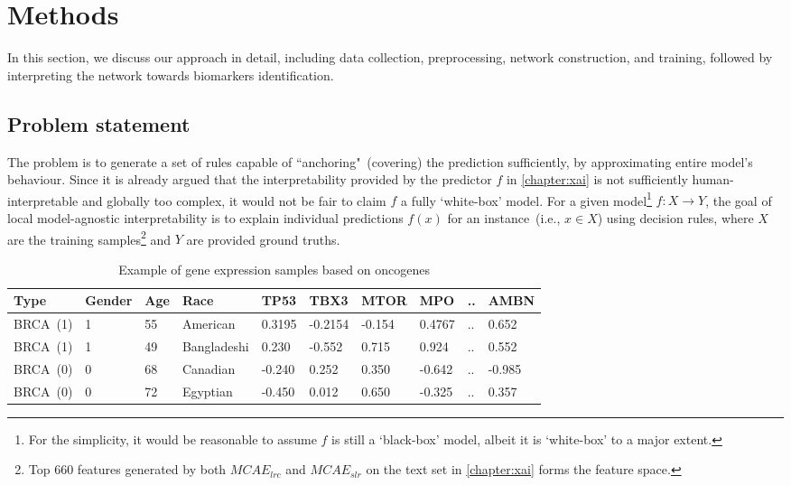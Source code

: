 \section{Methods} \label{chapter_7:mm}
In this section, we discuss our approach in detail, including data collection, preprocessing, network construction, and training, followed by interpreting the network towards biomarkers identification. 

\subsection{Problem statement}
The problem is to generate a set of rules capable of ``anchoring"~(covering) the prediction sufficiently, by approximating entire model's behaviour. Since it is already argued that the interpretability provided by the predictor ${f}$ in \cref{chapter:xai} is not sufficiently human-interpretable and globally too complex, it would not be fair to claim ${f}$ a fully `white-box' model. For a given model\footnote{For the simplicity, it would be reasonable to assume ${f}$ is  still a `black-box' model, albeit it is `white-box' to a major extent.} ${f}: X \rightarrow Y$, the goal of local model-agnostic interpretability is to explain individual predictions ${f}(x)$ for an instance~(i.e., $x \in X$) using decision rules, where $X$ are the training samples\footnote{Top 660 features generated by both $MCAE_{lrc}$ and $MCAE_{slr}$ on the text set in \cref{chapter:xai} forms the feature space.} and $Y$ are provided ground truths. %

\begin{table}[h!]
    \caption{Example of gene expression samples based on oncogenes}
    \label{ge:ancor_example}
    \vspace{-6mm}
    \begin{center}
        \scriptsize
        \begin{tabular}{l|l|l|l|l|l|l|l|l|l}
            \hline
            \rowcolor{Gray}
            \textbf{Type} & \textbf{Gender} & \textbf{Age} & \textbf{Race} & \textbf{TP53} & \textbf{TBX3} & \textbf{MTOR} & \textbf{MPO}  & .. & \textbf{AMBN} \\\hline    
            BRCA~(1) & 1 & 55 & American & 0.3195 & -0.2154 & -0.154 & 0.4767  & .. & 0.652 \\\hline
            BRCA~(1) & 1 & 49 & Bangladeshi & 0.230 &  -0.552  & 0.715  & 0.924   & .. & 0.552 \\\hline
            BRCA~(0) & 0 & 68 & Canadian & -0.240 &  0.252  & 0.350  & -0.642  & .. & -0.985 \\\hline
            BRCA~(0) & 0 & 72 & Egyptian & -0.450 &  0.012  & 0.650  & -0.325  & .. & 0.357 \\\hline
        \end{tabular}
        \vspace{-4mm}
    \end{center}
\end{table}

